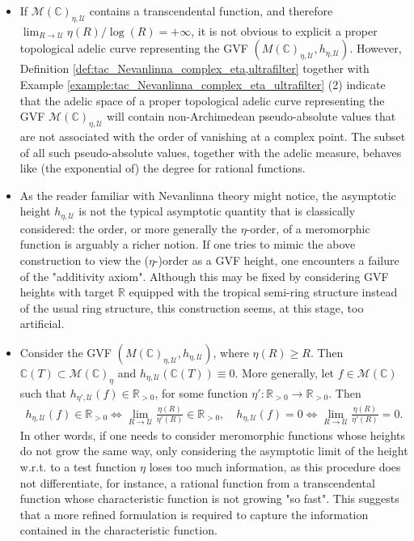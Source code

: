 \documentclass [11pt,reqno]{amsart}
\def\bC{{\mathbb{C}}}
\def\bR{{\mathbb{R}}}
\newcommand{\1}{\mathmybb{1}}
\def\cM{{\mathcal{M}}}
\def\cU{{\mathcal{U}}}
\begin{document}
\begin{remark}
\label{rem:tac_Nevanlinna_complex_eta_ultrafilter}
\begin{itemize}
	\item[(1)] If $\cM(\bC)_{\eta,\cU}$ contains a transcendental function, and therefore $\lim_{R\to\cU} \eta(R)/\log(R)=+\infty$, it is not obvious to explicit a proper topological adelic curve representing the GVF $(M(\bC)_{\eta,\cU},h_{\eta,\cU})$. However, Definition \ref{def:tac_Nevanlinna_complex_eta,ultrafilter} together with Example \ref{example:tac_Nevanlinna_complex_eta_ultrafilter} (2) indicate that the adelic space of a proper topological adelic curve representing the GVF $\cM(\bC)_{\eta,\cU}$ will contain non-Archimedean pseudo-absolute values that are not associated with the order of vanishing at a complex point. The subset of all such pseudo-absolute values, together with the adelic measure, behaves like (the exponential of) the degree for rational functions. 
	\item[(2)] As the reader familiar with Nevanlinna theory might notice, the asymptotic height $h_{\eta,\cU}$ is not the typical asymptotic quantity that is classically considered: the order, or more generally the $\eta$-order, of a meromorphic function is arguably a richer notion. If one tries to mimic the above construction to view the ($\eta$-)order as a GVF height, one encounters a failure of the "additivity axiom". Although this may be fixed by considering GVF heights with target $\bR$ equipped with the tropical semi-ring structure instead of the usual ring structure, this construction seems, at this stage, too artificial. 
	\item[(3)] Consider the GVF $(M(\bC)_{\eta,\cU},h_{\eta,\cU})$, where $\eta(R)\geq R$. Then $\bC(T)\subset \cM(\bC)_{\eta}$ and $h_{\eta,\cU}(\bC(T))\equiv 0$. More generally, let $f\in \cM(\bC)$ such that $h_{\eta',\cU}(f)\in \bR_{>0}$, for some function $\eta':\bR_{>0}\to \bR_{>0}$. Then
	\begin{align*}
	h_{\eta,\cU}(f) \in \bR_{>0} \Leftrightarrow \displaystyle\lim_{R\to\cU}\frac{\eta(R)}{\eta'(R)} \in \bR_{>0}, \quad h_{\eta,\cU}(f) = 0 \Leftrightarrow \displaystyle\lim_{R\to\cU}\frac{\eta(R)}{\eta'(R)} = 0.
\end{align*}	 
In other words, if one needs to consider meromorphic functions whose heights do not grow the same way, only considering the asymptotic limit of the height w.r.t. to a test function $\eta$ loses too much information, as this procedure does not differentiate, for instance, a rational function from a transcendental function whose characteristic function is not growing "so fast". This suggests that a more refined formulation is required to capture the information contained in the characteristic function.
\end{itemize}
\end{remark}
\end{document}
